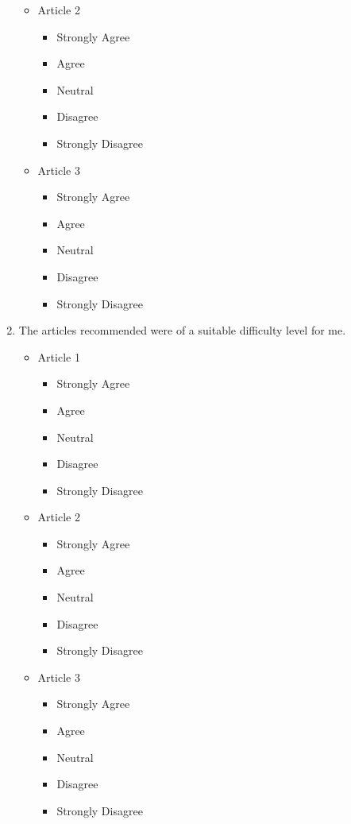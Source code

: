 \begin{enumerate}
\begin{itemize}
			\item Article 2
			\begin{itemize}
				\item Strongly Agree
				\item Agree
				\item Neutral
				\item Disagree
				\item Strongly Disagree
			\end{itemize}
			
			\item Article 3
			\begin{itemize}
				\item Strongly Agree
				\item Agree
				\item Neutral
				\item Disagree
				\item Strongly Disagree
			\end{itemize}
		\end{itemize}
		
	\item The articles recommended were of a suitable difficulty level for me. 
		\begin{itemize}
			\item Article 1
			\begin{itemize}
				\item Strongly Agree
				\item Agree
				\item Neutral
				\item Disagree
				\item Strongly Disagree
			\end{itemize}
			
			\item Article 2
			\begin{itemize}
				\item Strongly Agree
				\item Agree
				\item Neutral
				\item Disagree
				\item Strongly Disagree
			\end{itemize}
			
			\item Article 3
			\begin{itemize}
				\item Strongly Agree
				\item Agree
				\item Neutral
				\item Disagree
				\item Strongly Disagree
			\end{itemize}
		\end{itemize}


\end{enumerate}
